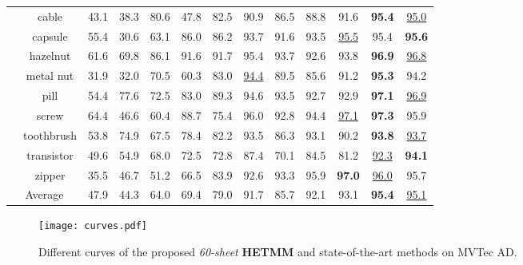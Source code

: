 \documentclass[default,iicol]{sn-jnl}\usepackage[algo2e,ruled,linesnumbered]{algorithm2e}
\theoremstyle{thmstyleone}\newtheorem{theorem}{Theorem}\newtheorem{proposition}[theorem]{Proposition}
\theoremstyle{thmstyletwo}\newtheorem{example}{Example}\newtheorem{remark}{Remark}
\theoremstyle{thmstylethree}\newtheorem{definition}{Definition}
\begin{document}
\begin{table*}[!t]
\begin{tabular}{c|c|ccccccccc|cc}
    &cable                &43.1      &38.3      &80.6       &47.8       &82.5         &90.9       &86.5      &88.8      &91.6      &\textbf{95.4}            &\underline{95.0}\\
    &capsule              &55.4      &30.6      &63.1       &86.0       &86.2         &93.7       &91.6      &93.5      &\underline{95.5}      &95.4            &\textbf{95.6}\\
    &hazelnut             &61.6      &69.8      &86.1       &91.6       &91.7         &95.4       &93.7      &92.6      &93.8      &\textbf{96.9}            &\underline{96.8}\\
    &metal nut            &31.9      &32.0      &70.5       &60.3       &83.0         &\underline{94.4}       &89.5      &85.6      &91.2      &\textbf{95.3}            &94.2\\
    &pill                 &54.4      &77.6      &72.5       &83.0       &89.3         &94.6       &93.5      &92.7      &92.9      &\textbf{97.1}            &\underline{96.9}\\
    &screw                &64.4      &46.6      &60.4       &88.7       &75.4         &96.0       &92.8      &94.4      &\underline{97.1}      &\textbf{97.3}            &95.9\\
    &toothbrush           &53.8      &74.9      &67.5       &78.4       &82.2         &93.5       &86.3      &93.1      &90.2      &\textbf{93.8}            &\underline{93.7}\\ 
    &transistor           &49.6      &54.9      &68.0       &72.5       &72.8         &87.4       &70.1      &84.5      &81.2      &\underline{92.3}            &\textbf{94.1}\\ 
    &zipper               &35.5      &46.7      &51.2       &66.5       &83.9         &92.6       &93.3      &95.9      &\textbf{97.0}      &\underline{96.0}            &95.7\\\hline      
    \multicolumn{2}{c|}{Average}                                                                                            
                          &47.9      &44.3      &64.0       &69.4       &79.0         &91.7       &85.7      &92.1      &93.1      &\textbf{95.4}            &\underline{95.1}\\\hline
    \end{tabular}
    \label{table:PRO}
\end{table*}

\begin{figure*}[!t]
    \centering
        \texttt{[image: curves.pdf]}
    \caption{Different curves of the proposed \textit{60-sheet} \textbf{HETMM} and state-of-the-art methods on MVTec AD.
    }
    \label{fig:curves}
\end{figure*}
\end{document}
